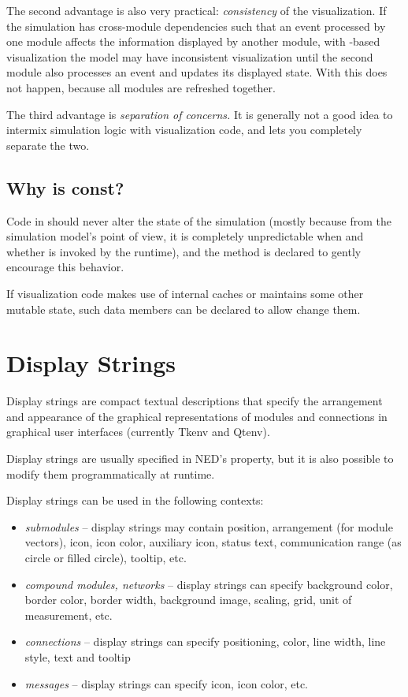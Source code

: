 The second advantage is also very practical: \textit{consistency} of the
visualization. If the simulation has cross-module dependencies such that
an event processed by one module affects the information displayed
by another module, with -based visualization
the model may have inconsistent visualization until the second module
also processes an event and updates its displayed state. With
 this does not happen, because all modules
are refreshed together.

The third advantage is \textit{separation of concerns.} It is generally
not a good idea to intermix simulation logic with visualization code,
and  lets you completely separate the two.


\subsection{Why is  const?}

Code in  should never alter the state of the
simulation (mostly because from the simulation model's point of
view, it is completely unpredictable when and whether 
is invoked by the runtime), and the method is declared  to gently
encourage this behavior.

If visualization code makes use of internal caches or maintains some
other mutable state, such data members can be declared 
to allow  change them.


\section{Display Strings}
\label{sec:ch-graphics:display-strings}

Display strings are compact textual descriptions
that specify the arrangement and appearance of the graphical
representations of modules and connections in graphical user interfaces
(currently Tkenv and Qtenv).

Display strings are usually specified in NED's  property,
but it is also possible to modify them programmatically at runtime.

Display strings can be used in the following contexts:
\begin{itemize}
  \item \textit{submodules} -- display strings may contain position, arrangement
        (for module vectors), icon, icon color, auxiliary icon, status text,
        communication range (as circle or filled circle), tooltip, etc.
  \item \textit{compound modules, networks} -- display strings can specify
        background color, border color, border width,
        background image, scaling, grid, unit of measurement, etc.
  \item \textit{connections} -- display strings can specify positioning, color,
        line width, line style, text and tooltip
  \item \textit{messages} -- display strings can specify icon, icon color, etc.
\end{itemize}


